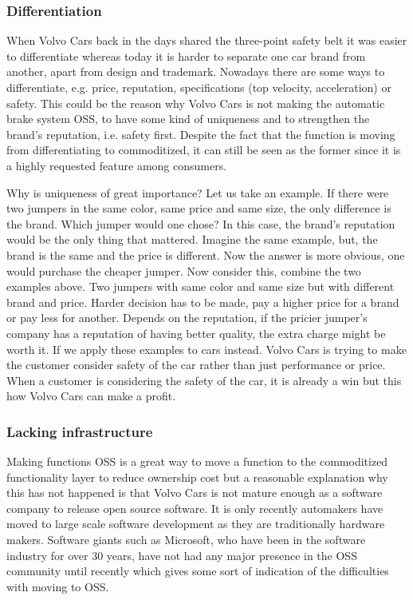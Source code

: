 \documentclass[conference]{IEEEtran}
\begin{document}
\subsubsection{Differentiation}
When Volvo Cars back in the days shared the three-point safety belt it was easier to differentiate whereas today it is harder to separate one car brand from another, apart from design and trademark. Nowadays there are some ways to differentiate, e.g. price, reputation, specifications (top velocity, acceleration) or safety. This could be the reason why Volvo Cars is not making the automatic brake system OSS, to have some kind of uniqueness and to strengthen the brand's reputation, i.e. safety first. Despite the fact that the function is moving from differentiating to commoditized, it can still be seen as the former since it is a highly requested feature among consumers. \cite{AEBStatistics,VolvoVision}

Why is uniqueness of great importance? Let us take an example. If there were two jumpers in the same color, same price and same size, the only difference is the brand. Which jumper would one chose? In this case, the brand's reputation would be the only thing that mattered. Imagine the same example, but, the brand is the same and the price is different. Now the answer is more obvious, one would purchase the cheaper jumper. Now consider this, combine the two examples above. Two jumpers with same color and same size but with different brand and price. Harder decision has to be made, pay a higher price for a brand or pay less for another. Depends on the reputation, if the pricier jumper's company has a reputation of having better quality, the extra charge might be worth it. If we apply these examples to cars instead. Volvo Cars is trying to make the customer consider safety of the car rather than just performance or price. When a customer is considering the safety of the car, it is already a win but this how Volvo Cars can make a profit.

\subsubsection{Lacking infrastructure}
Making functions OSS is a great way to move a function to the commoditized functionality layer to reduce ownership cost but a  reasonable explanation why this has not happened is that Volvo Cars is not mature enough as a software company to release open source software. It is only recently automakers have moved to large scale software development as they are traditionally hardware makers. Software giants such as Microsoft, who have been in the software industry for over 30 years, have not had any major presence in the OSS community until recently which gives some sort of indication of the difficulties with moving to OSS.
\end{document}
